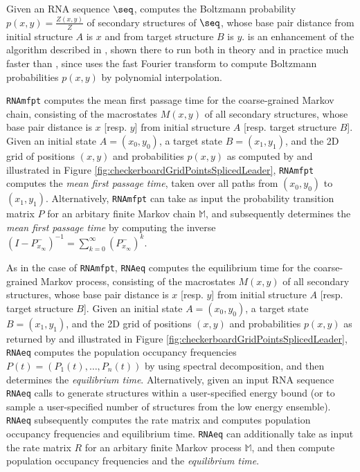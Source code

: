 Given an RNA sequence $\seq$,  \ffttwo computes the Boltzmann probability
$p(x,y) = \frac{Z(x,y)}{Z}$ of secondary structures of $\seq$, whose base
pair distance from initial structure $A$ is $x$ and from target structure
$B$ is $y$. \ffttwo is an enhancement of the algorithm
described in \cite{Senter.jmb14}, shown there
to run both in theory and in practice much faster than \rnatwofold
\cite{hofacker:RNAbor2D},
since \ffttwo uses the fast Fourier transform to
compute Boltzmann probabilities $p(x,y)$ by polynomial interpolation.


{\tt RNAmfpt} computes the mean first passage time for the
coarse-grained Markov chain,
consisting of the macrostates $M(x,y)$ of all secondary structures,
whose base pair distance is $x$ [resp. $y$] from initial structure $A$
[resp. target structure $B$].
Given an initial state $A=(x_0,y_0)$, a
target state $B=(x_1,y_1)$, and the 2D grid of positions $(x,y)$
and probabilities $p(x,y)$ as computed by \ffttwo and
illustrated in
Figure \ref{fig:checkerboardGridPointsSplicedLeader},
{\tt RNAmfpt} computes the {\em mean first passage time}, taken
over all paths from $(x_0,y_0)$ to  $(x_1,y_1)$.  Alternatively,
{\tt RNAmfpt} can take as input the probability transition matrix $P$ for
an arbitary finite Markov chain $\mathbb{M}$, and subsequently
determines the {\em mean first passage time} by computing the inverse
$(I - P^{-}_{x_{\infty}})^{-1} = \displaystyle\sum_{k=0}^{\infty}
(P^{-}_{x_{\infty}})^k$.


As in the case of {\tt RNAmfpt}, {\tt RNAeq}
computes the equilibrium time for the coarse-grained Markov process,
consisting of the macrostates $M(x,y)$ of all secondary structures,
whose base pair distance is $x$ [resp. $y$] from initial structure $A$
[resp. target structure $B$].
Given an initial state $A=(x_0,y_0)$, a
target state $B=(x_1,y_1)$, and the 2D grid of positions $(x,y)$
and probabilities $p(x,y)$ as returned by \ffttwo and
illustrated in
Figure \ref{fig:checkerboardGridPointsSplicedLeader},
{\tt RNAeq} computes the population occupancy frequencies
$P(t) = (P_1(t),\ldots,P_n(t))$ by using spectral decomposition, and
then determines the {\em equilibrium time}.
Alternatively, given an input RNA sequence {\tt RNAeq}
calls \rnasub \cite{wuchtyFontanaHofackerSchuster} to generate
structures within a user-specified energy bound (or to sample a user-specified
number of structures from the low energy ensemble). {\tt RNAeq} subsequently
computes the rate matrix and computes population occupancy frequencies
and equilibrium time. {\tt RNAeq} can additionally
take as input the rate matrix $R$ for
an arbitary finite Markov process $\mathbb{M}$, and then
compute population occupancy frequencies
and the {\em equilibrium time}.

